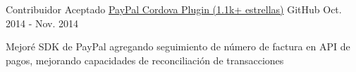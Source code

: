 \begin{cventries}
  \cventry
    {Contribuidor Aceptado} %
    {\faPaypal \hphantom{-} \href{https://github.com/paypal/PayPal-Cordova-Plugin}{PayPal Cordova Plugin (1.1k+ estrellas)}} %
    {\faGithubSquare\acvHeaderIconSep GitHub} %
    {Oct. 2014 - Nov. 2014} %
    {
      \begin{cvitems} %
        \item {Mejoré SDK de PayPal agregando seguimiento de número de factura en API de pagos, mejorando capacidades de reconciliación de transacciones}
      \end{cvitems}
    }

\end{cventries}
